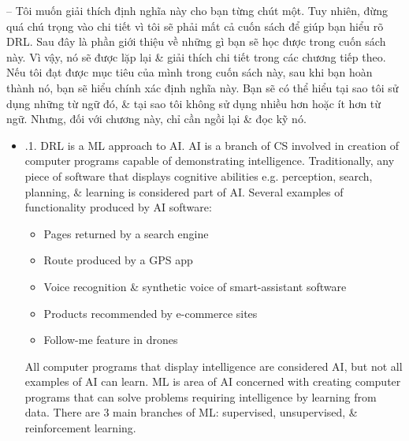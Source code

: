\documentclass{article}
\begin{document}
\begin{itemize}
\begin{itemize}
        -- Tôi muốn giải thích định nghĩa này cho bạn từng chút một. Tuy nhiên, đừng quá chú trọng vào chi tiết vì tôi sẽ phải mất cả cuốn sách để giúp bạn hiểu rõ DRL. Sau đây là phần giới thiệu về những gì bạn sẽ học được trong cuốn sách này. Vì vậy, nó sẽ được lặp lại \& giải thích chi tiết trong các chương tiếp theo. Nếu tôi đạt được mục tiêu của mình trong cuốn sách này, sau khi bạn hoàn thành nó, bạn sẽ hiểu chính xác định nghĩa này. Bạn sẽ có thể hiểu tại sao tôi sử dụng những từ ngữ đó, \& tại sao tôi không sử dụng nhiều hơn hoặc ít hơn từ ngữ. Nhưng, đối với chương này, chỉ cần ngồi lại \& đọc kỹ nó.
        \begin{itemize}
            \item {.1. DRL is a ML approach to AI.} AI is a branch of CS involved in creation of computer programs capable of demonstrating intelligence. Traditionally, any piece of software that displays cognitive abilities e.g. perception, search, planning, \& learning is considered part of AI. Several examples of functionality produced by AI software:
            \begin{itemize}
                \item Pages returned by a search engine
                \item Route produced by a GPS app
                \item Voice recognition \& synthetic voice of smart-assistant software
                \item Products recommended by e-commerce sites
                \item Follow-me feature in drones
            \end{itemize}
            All computer programs that display intelligence are considered AI, but not all examples of AI can learn. ML is area of AI concerned with creating computer programs that can solve problems requiring intelligence by learning from data. There are 3 main branches of ML: supervised, unsupervised, \& reinforcement learning.


\end{itemize}
\end{itemize}
\end{itemize}
\end{document}
